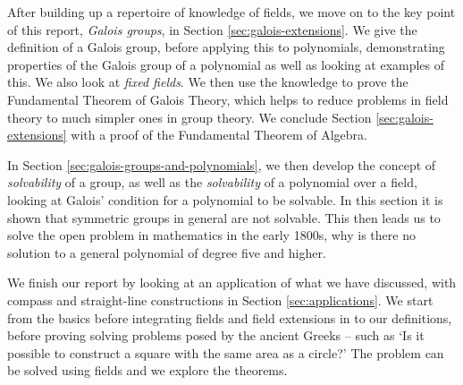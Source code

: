 After building up a repertoire of knowledge of fields, we move on to the key point of this report, \textit{Galois groups}, in Section \ref{sec:galois-extensions}. We give the definition of a Galois group, before applying this to polynomials, demonstrating properties of the Galois group of a polynomial as well as looking at examples of this. We also look at \textit{fixed fields}.  We then use the knowledge to prove the Fundamental Theorem of Galois Theory, which helps to reduce problems in field theory to much simpler ones in group theory. We conclude Section \ref{sec:galois-extensions} with a proof of the Fundamental Theorem of Algebra.

In Section \ref{sec:galois-groups-and-polynomials}, we then develop the concept of \textit{solvability} of a group, as well as the \textit{solvability} of a polynomial over a field, looking at Galois’ condition for a polynomial to be solvable. In this section it is shown that symmetric groups in general are not solvable. This then leads us to solve the open problem in mathematics in the early 1800s, why is there no solution to a general polynomial of degree five and higher.

We finish our report by looking at an application of what we have discussed, with compass and straight-line constructions in Section \ref{sec:applications}. We start from the basics before integrating fields and field extensions in to our definitions, before proving solving problems posed by the ancient Greeks – such as ‘Is it possible to construct a square with the same area as a circle?’ The problem can be solved using fields and we explore the theorems.
